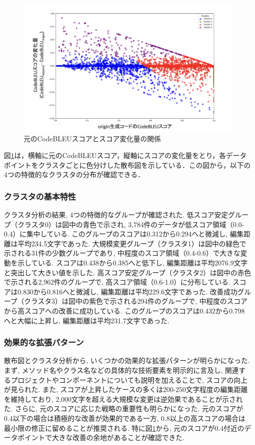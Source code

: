 \documentclass[11pt]{jreport}
\begin{document}
\begin{figure}[htbp]
\centering
\includegraphics[width=0.9\linewidth]{@BSthesis2024_Akamatsu/Akamatsu_figs/rq2_result02_02.png}
\caption{元のCodeBLEUスコアとスコア変化量の関係}
\label{fig:scatter-cluster}
\end{figure}
図\ref{fig:scatter-cluster}は，横軸に元のCodeBLEUスコア，縦軸にスコアの変化量をとり，各データポイントをクラスタごとに色分けした散布図を示している．この図から，以下の4つの特徴的なクラスタの分布が確認できる．

\subsubsection{クラスタの基本特性}
クラスタ分析の結果, 4つの特徴的なグループが確認された. 低スコア安定グループ（クラスタ0）は図中の青色で示され, 3,784件のデータが低スコア領域（0.0-0.4）に集中している. このグループのスコアは0.312から0.294へと微減し, 編集距離は平均234.5文字であった. 大規模変更グループ（クラスタ1）は図中の緑色で示される31件の少数グループであり, 中程度のスコア領域（0.4-0.6）で大きな変動を示している. スコアは0.438から0.385へと低下し, 編集距離は平均2076.9文字と突出して大きい値を示した. 高スコア安定グループ（クラスタ2）は図中の赤色で示される2,962件のグループで, 高スコア領域（0.6-1.0）に分布している. スコアは0.830から0.816へと微減し, 編集距離は平均229.6文字であった. 改善成功グループ（クラスタ3）は図中の紫色で示される294件のグループで, 中程度のスコアから高スコアへの改善に成功している. このグループのスコアは0.432から0.798へと大幅に上昇し, 編集距離は平均231.7文字であった.
\subsubsection{効果的な拡張パターン}
散布図とクラスタ分析から, いくつかの効果的な拡張パターンが明らかになった. まず, メソッド名やクラス名などの具体的な技術要素を明示的に言及し, 関連するプロジェクトやコンポーネントについても説明を加えることで, スコアの向上が見られた. また, スコアが上昇したケースの多くは200-250文字程度の編集距離を維持しており, 2,000文字を超える大規模な変更は逆効果であることが示された. さらに, 元のスコアに応じた戦略の重要性も明らかになった. 元のスコアが0.4以下の場合は積極的な改善が効果的である一方, 0.8以上の高スコアの場合は最小限の修正に留めることが推奨される. 特に図\ref{fig:scatter-cluster}から, 元のスコアが0.4付近のデータポイントで大きな改善の余地があることが確認できた.
\end{document}
